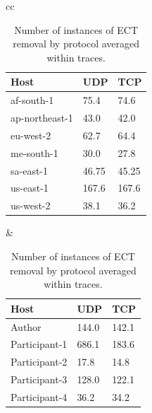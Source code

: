 \documentclass{l4proj}
\begin{document}
\begin{table}[H]
\begin{tabular}{cc}
\centering
    \begin{minipage}{.5\linewidth}
        \begin{tabular}{|l|l|l|}
            \hline
            Host           & UDP   & TCP   \\ \hline
            af-south-1     & 75.4  & 74.6  \\ \hline
            ap-northeast-1 & 43.0  & 42.0  \\ \hline
            eu-west-2      & 62.7  & 64.4  \\ \hline
            me-south-1     & 30.0  & 27.8  \\ \hline
            sa-east-1      & 46.75 & 45.25 \\ \hline
            us-east-1      & 167.6 & 167.6 \\ \hline
            us-west-2      & 38.1  & 36.2  \\ \hline
        \end{tabular}
    \end{minipage} &

    \begin{minipage}{.5\linewidth}
        \begin{tabular}{|l|l|l|}
            \hline
            Host          & UDP   & TCP   \\ \hline
            Author        & 144.0 & 142.1 \\ \hline
            Participant-1 & 686.1 & 183.6 \\ \hline
            Participant-2 & 17.8  & 14.8  \\ \hline
            Participant-3 & 128.0 & 122.1 \\ \hline
            Participant-4 & 36.2  & 34.2  \\ \hline
        \end{tabular}
    \end{minipage}
    
\end{tabular}
\caption{Number of instances of ECT removal by protocol averaged within traces.}
\label{table:protoect}
\end{table}
\end{document}
